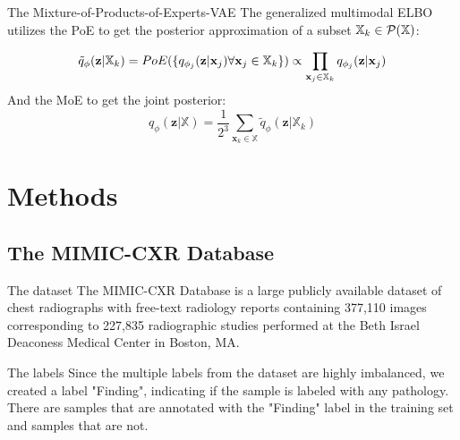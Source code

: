     \begin{frame}{The Mixture-of-Products-of-Experts-VAE}
        The generalized multimodal ELBO utilizes the PoE to get the posterior approximation of a subset $\mathbb{X}_k \in \mathcal{P}(\mathbb{X})$:

        \begin{equation}
            \tilde{q}_{\phi}(\textbf{z}|\mathbb{X}_k)=PoE(\{q_{\phi_j}(\textbf{z}|\textbf{x}_j) \forall \textbf{x}_j \in \mathbb{X}_k\}) \propto \prod _{\textbf{x}_j \in \mathbb{X}_k}q_{\phi_j}(\textbf{z}|\textbf{x}_j)
        \end{equation}
        And the MoE to get the joint posterior:
        \begin{equation}
            q_{\phi}(\textbf{z}|\mathbb{X}) = \frac{1}{2^3} \sum _{\textbf{x}_k \in \mathbb{X}} \tilde{q}_{\phi} (\textbf{z}|\mathbb{X}_k)
        \end{equation}
    \end{frame}

    \begin{frame}{}


    \end{frame}


    \section{Methods}

    \subsection{The MIMIC-CXR Database}
    \begin{frame}{The dataset}
        The MIMIC-CXR Database \cite{johnson2019mimic} is a large publicly available dataset of chest radiographs with free-text radiology reports containing 377,110 images corresponding to 227,835 radiographic studies performed at the Beth Israel Deaconess Medical Center in Boston, MA.

    \end{frame}

    \begin{frame}
    \end{frame}

    \begin{frame}{The labels}
        Since the multiple labels from the dataset are highly imbalanced, we created a label "Finding", indicating if the sample is labeled with any pathology.\\
        There are  samples that are annotated with the "Finding" label in the training set and  samples that are not.
    \end{frame}

